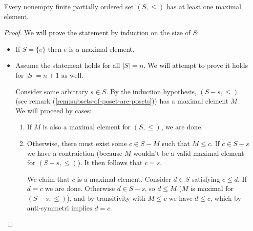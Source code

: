 \begin{lemma}\label{lem:nonempty-finite-posets-have-maximal-elements}
   Every nonempty finite partially ordered set $(S, \leq )$ has at least one maximal element. 
 \end{lemma}

 \begin{proof}
  We will prove the statement by induction on the size of $S$:
  \begin{itemize}
    \item If $S = \{e\}$ then $e$ is a maximal element.
    \item Assume the statement holds for all $|S| = n$. We will attempt to prove it holds for $|S| = n + 1$ as well. 

      Consider some arbitrary $s \in S$. By the induction hypothesis, $(S - s, \leq)$ (see remark (\ref{rem:subsets-of-poset-are-posets})) has a maximal element $M$. We will proceed by cases:
      \begin{enumerate}
        \item If $M$ is also a maximal element for $(S, \leq)$, we are done.
        \item Otherwise, there must exist some $c \in S - M$ such that $M \leq  c$. If $c \in S - s$ we have a contraiction (because $M$ wouldn't be a valid maximal element for $(S - s, \leq )$). It then follows that $c = s$. 

          We claim that $c$ is a maximal element. Consider $d \in S$ satisfying $c \leq d$. If $d = c$ we are done. Otherwise $d \in S - s$, so $d \leq M$ ($M$ is maximal for $(S - s, \leq )$), and by transitivity with $M \leq c$ we have $d \leq c$, which by anti-symmetri implies $d = c$.
      \end{enumerate}
  \end{itemize}
 \end{proof}
